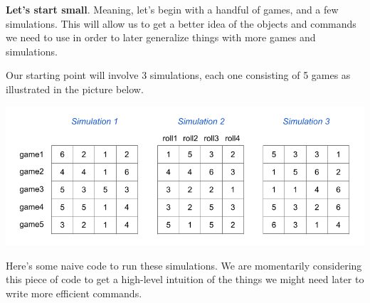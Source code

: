 \documentclass[
]{book}
\begin{document}
\textbf{Let's start small}. Meaning, let's begin with a handful of games, and a few
simulations. This will allow us to get a better idea of the objects and
commands we need to use in order to later generalize things with more games
and simulations.

Our starting point will involve 3 simulations, each one consisting of 5 games
as illustrated in the picture below.

\begin{center}\includegraphics[width=0.8\linewidth]{images/demere-3-simulations} \end{center}

Here's some naive code to run these simulations. We are momentarily considering
this piece of code to get a high-level intuition of the things we might need
later to write more efficient commands.
\end{document}
